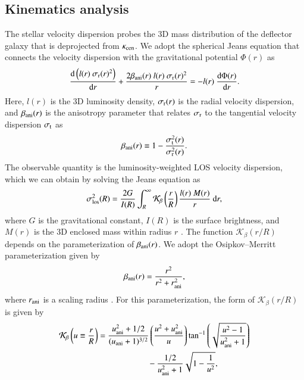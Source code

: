 \documentclass[longauth]{aa}
\newcommand{\rmd}{{\rm d}}
\begin{document}
\subsection{Kinematics analysis} \label{sec:kinematics_theory}

The stellar velocity dispersion probes the 3D mass distribution of the deflector galaxy that is deprojected from $\kappa_{\rm cen}$. We adopt the spherical Jeans equation that connects the velocity dispersion with the gravitational potential $\Phi(r)$ as
%
\begin{equation}
        \frac{\rmd \left( l(r)\ \sigma_{\rm r}(r)^2 \right)}{\rmd r} + \frac{2 \beta_{\rm ani}(r)\ l(r) \  \sigma_{\rm r}(r)^2}{r} = - l(r) \ \frac{\rmd \Phi(r)}{\rmd r}.
\end{equation}
%
Here, $l(r)$ is the 3D luminosity density, $\sigma_{\rm r} (r)$ is the radial velocity dispersion, and $\beta_{\rm ani} (r)$ is the anisotropy parameter that relates $\sigma_{\rm r}$ to the tangential velocity dispersion $\sigma_{\rm t}$ as
%
\begin{equation}
        \beta_{\rm ani}(r) \equiv 1 - \frac{\sigma_{\rm t}^2(r)}{\sigma_{\rm r}^2(r)}.
\end{equation}
%
The observable quantity is the luminosity-weighted LOS velocity dispersion, which we can obtain by solving the Jeans equation as
%
\begin{equation} \label{eq:jeans_solution}
        \sigma_{\rm los}^2(R) = \frac{2G}{I(R)} \int_R^{\infty} \mathcal{K}_{\beta} \left(\frac{r}{R} \right) \frac{l(r)\ M(r)}{r} \ \rmd r,
\end{equation}
%
where $G$ is the gravitational constant, $I(R)$ is the surface brightness, and $M(r)$ is the 3D enclosed mass within radius $r$ \citep[Eqs. A15--A16 of][]{Mamon05}. The function $\mathcal{K}_{\beta}(r/R)$ depends on the parameterization of $\beta_{\rm ani}(r)$. We adopt the Osipkov--Merritt parameterization given by
%
\begin{equation}
        \beta_{\rm ani}(r) = \frac{r^2}{r^2 + r_{\rm ani}^2},
\end{equation}
%
where $r_{\rm ani}$ is a scaling radius \citep{Osipkov79, Merritt85, Merritt85b}. For this parameterization, the form of $\mathcal{K}_{\beta}(r/R)$ is given by
%
\begin{equation}
\begin{split}
                \mathcal{K}_{\beta} \left(u\equiv\frac{r}{R} \right) &= \frac{u_{\rm ani}^2 + 1/2}{(u_{\rm ani}+1)^{3/2}}    \left( \frac{u^2+u_{\rm ani}^2}{u} \right) \tan^{-1} \left( \sqrt{\frac{u^2-1}{u^2_{\rm ani}+1}} \right)  \\
                &\qquad\qquad\qquad - \frac{1/2}{u_{\rm ani}^2 + 1} \sqrt{1 - \frac{1}{u^2}},
\end{split}     
\end{equation}
\end{document}
